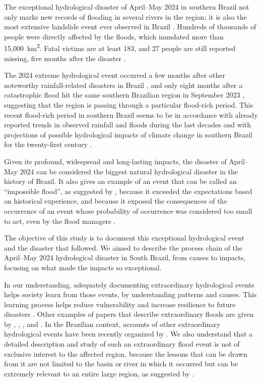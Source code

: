 The exceptional hydrological disaster of April--May 2024 in
southern Brazil not only marks new records of flooding in several
rivers in the region; it is also the most extensive landslide
event ever observed in Brazil
\parencite{cemaden2024a,andrades2024}. Hundreds of thousands of
people were directly affected by the floods, which inundated more
than 15,000~km\textsuperscript{2}. Fatal victims are at least
183, and 27 people are still reported missing, five months after
the disaster \parencite{rs2024d}.

The 2024 extreme hydrological event occurred a few months after
other noteworthy rainfall-related disasters in Brazil
\parencite{marengo2023a,marengo2023b,marengo2024}, and only eight
months after a catastrophic flood hit the same southern Brazilian
region in September 2023 \parencite{alvala2024,moraes2024},
suggesting that the region is passing through a particular
flood-rich period. This recent flood-rich period in southern
Brazil seems to be in accordance with already reported trends in
observed rainfall and floods during the last decades
\parencite{chagas2022} and with projections of possible
hydrological impacts of climate change in southern Brazil for the
twenty-first century \parencite{breda2023,hodnebrog2022}.

Given its profound, widespread and long-lasting impacts, the
disaster of April--May 2024 can be considered the biggest natural
hydrological disaster in the history of Brazil. It also gives an
example of an event that can be called an ``impossible flood'',
as suggested by \textcite{montanari2024}, because it exceeded the
expectations based on historical experience, and because it
exposed the consequences of the occurrence of an event whose
probability of occurrence was considered too small to act, even
by the flood managers \parencite{allasia2015}.

The objective of this study is to document this exceptional
hydrological event and the disaster that followed. We aimed to
describe the process chain of the April--May 2024 hydrological
disaster in South Brazil, from causes to impacts, focusing on
what made the impacts so exceptional.

In our understanding, adequately documenting extraordinary
hydrological events helps society learn from those events, by
understanding patterns and causes. This learning process helps
reduce vulnerability and increase resilience to future disasters
\parencite{zanandrea2023}. Other examples of papers that describe
extraordinary floods are given by \textcite{gaume2004},
\textcite{dimitriou2024}, \textcite{mohr2023},
\textcite{nanditha2023} and \textcite{kreibich2017}. In the
Brazilian context, accounts of other extraordinary hydrological
events have been recently organized by \textcite{zanandrea2023}.
We also understand that a detailed description and study of such
an extraordinary flood event is not of exclusive interest to the
affected region, because the lessons that can be drawn from it
are not limited to the basin or river in which it occurred but
can be extremely relevant to an entire large region, as suggested
by \textcite{merz2024}.


